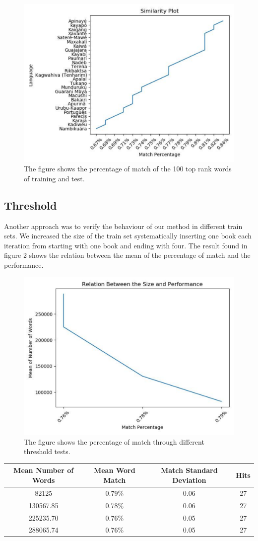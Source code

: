 \documentclass[12pt]{article}
\begin{document}
\begin{figure}[h!]
\centering
\includegraphics[width=.6\textwidth]{images/fig1.pdf}
\caption{The figure shows the percentage of match of the 100 top rank words of training and test.}
\label{fig:Fig1}
\end{figure}


\subsection{Threshold}\label{subsec:threshold}

Another approach was to verify the behaviour of our method in different train sets. We increased the size of the train set systematically inserting one book each iteration from starting with one book and ending with four. The result found in figure 2 shows the relation between the mean of the percentage of match and the performance.

\begin{figure}[h!]
\centering
\includegraphics[width=.5\textwidth]{images/fig2.pdf}
\caption{The figure shows the percentage of match through different threshold tests.}
\label{fig:Fig1}
\end{figure}

\begin{center}
\begin{tabular}{ ||c c c c|| }
\hline
Mean Number of Words & Mean Word Match & Match Standard Deviation & Hits\\ [0.5ex]
\hline\hline
82125 & 0.79\% & 0.06 & 27\\
130567.85 & 0.78\% & 0.06 & 27\\
225235.70 & 0.76\% & 0.05 & 27\\
288065.74 & 0.76\% & 0.05 & 27\\
\hline
\end{tabular}
\end{center}
\end{document}
